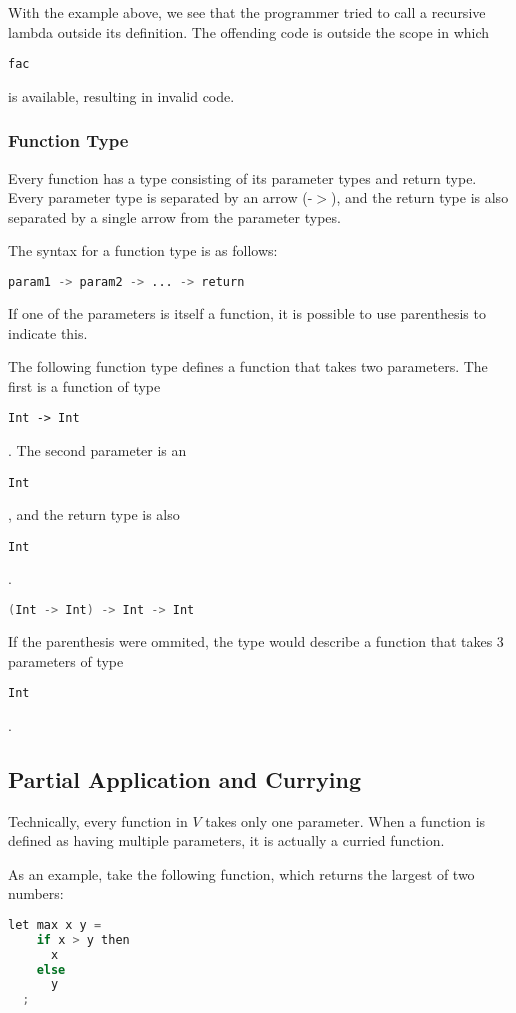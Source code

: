 \documentclass{article}
\def\code#1{\begin{footnotesize}\texttt{#1}\end{footnotesize}}
\begin{document}
With the example above, we see that the programmer tried to call a recursive lambda outside its definition.
The offending code is outside the scope in which \code{fac} is available, resulting in invalid code.

\subsubsection{Function Type}\label{Function Type}

Every function has a type consisting of its parameter types and return type.
Every parameter type is separated by an arrow (-$>$), and the return type is also separated by a single arrow from the parameter types.

The syntax for a function type is as follows:
\begin{lstlisting}[language=V]
  param1 -> param2 -> ... -> return
\end{lstlisting}

\smallskip

 If one of the parameters is itself a function, it is possible to use parenthesis to indicate this.

The following function type defines a function that takes two parameters.
The first is a function of type \code{Int -> Int}.
The second parameter is an \code{Int}, and the return type is also \code{Int}.

 \begin{lstlisting}[language=V]
   (Int -> Int) -> Int -> Int
 \end{lstlisting}

If the parenthesis were ommited, the type would describe a function that takes 3 parameters of type \code{Int}.

\subsection{Partial Application and Currying}

Technically, every function in $V$ takes only one parameter.
When a function is defined as having multiple parameters, it is actually a curried function.

As an example, take the following function, which returns the largest of two numbers:

\begin{lstlisting}[language=V]
  let max x y =
    if x > y then
      x
    else
      y
  ;
\end{lstlisting}
\end{document}

